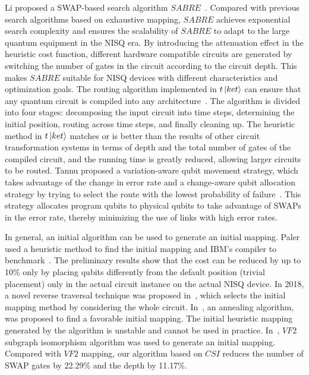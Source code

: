 \documentclass[runningheads]{llncs}
\begin{document}
\begin{enumerate}
	Li proposed a SWAP-based search algorithm $SABRE$~\cite{Li2018}. Compared with previous search algorithms based on exhaustive mapping, $SABRE$ achieves exponential search complexity and ensures the scalability of $SABRE$ to adapt to the large quantum equipment in the NISQ era. By introducing the attenuation effect in the heuristic cost function, different hardware compatible circuits are generated by switching the number of gates in the circuit according to the circuit depth. This makes $SABRE$ suitable for NISQ devices with different characteristics and optimization goals. The routing algorithm implemented in $t\left\vert{ket}\right\rangle$ can ensure that any quantum circuit is compiled into any architecture~\cite{Cowtan2019}. The algorithm is divided into four stages: decomposing the input circuit into time steps, determining the initial position, routing across time steps, and finally cleaning up. The heuristic method in $t\left\vert{ket}\right\rangle$ matches or is better than the results of other circuit transformation systems in terms of depth and the total number of gates of the compiled circuit, and the running time is greatly reduced, allowing larger circuits to be routed. Tannu proposed a variation-aware qubit movement strategy, which takes advantage of the change in error rate and a change-aware qubit allocation strategy by trying to select the route with the lowest probability of failure~\cite{Tannu2019}. This strategy allocates program qubits to physical qubits to take advantage of SWAPs in the error rate, thereby minimizing the use of links with high error rates.
\end{enumerate} 
In general, an initial algorithm can be used to generate an initial mapping. Paler used a heuristic method to find the initial mapping and IBM's compiler to benchmark~\cite{Paler2018}. The preliminary results show that the cost can be reduced by up to 10\% only by placing qubits differently from the default position (trivial placement) only in the actual circuit instance on the actual NISQ device. In 2018, a novel reverse traversal technique was proposed in~\cite{Li2018}, which selects the initial mapping method by considering the whole circuit. In~\cite{Xiangzhen2020}, an annealing algorithm, was proposed to find a favorable initial mapping. The initial heuristic mapping generated by the algorithm is unstable and cannot be used in practice. In~\cite{2020Qubit}, $VF2$ subgraph isomorphism algorithm was used to generate an initial mapping. Compared with $VF2$ mapping, our algorithm based on $CSI$ reduces the number of SWAP gates by 22.29\% and the depth by 11.17\%.
\end{document}
